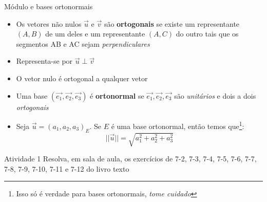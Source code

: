 \begin{frame}{Módulo e bases ortonormais}
    \begin{itemize}
        \item Os vetores não nulos \(\vec{u}\) e \(\vec{v}\) são \textbf{ortogonais} se existe um representante
            \((A,B)\) de um deles e um representante \((A,C)\) do outro tais que os segmentos AB e AC sejam
            \textit{perpendiculares}
        \item Representa-se por \(\vec{u} \perp \vec{v}\)
        \item O vetor nulo é ortogonal a qualquer vetor
        \item Uma base \((\vec{e_1},\vec{e_2},\vec{e_3})\) é \textbf{ortonormal} se \(\vec{e_1},\vec{e_2},\vec{e_3}\)
            são \textit{unitários} e dois a dois \textit{ortogonais}
        \item Seja \(\vec{u}=(a_1,a_2,a_3)_E\). Se \(E\) é uma base ortonormal, então temos
            que\footnote{Isso só é verdade para bases ortonormais, \textit{tome cuidado}}:
            \[
                ||\vec{u}||=\sqrt{a_1^2+a_2^2+a_3^2}
            \]

    \end{itemize}
\end{frame}

\begin{frame}{Atividade 1}
    Resolva, em sala de aula, os exercícios de 7-2, 7-3, 7-4, 7-5, 7-6, 7-7, 7-8, 7-9, 7-10, 7-11 e 7-12 do livro texto
\end{frame}
